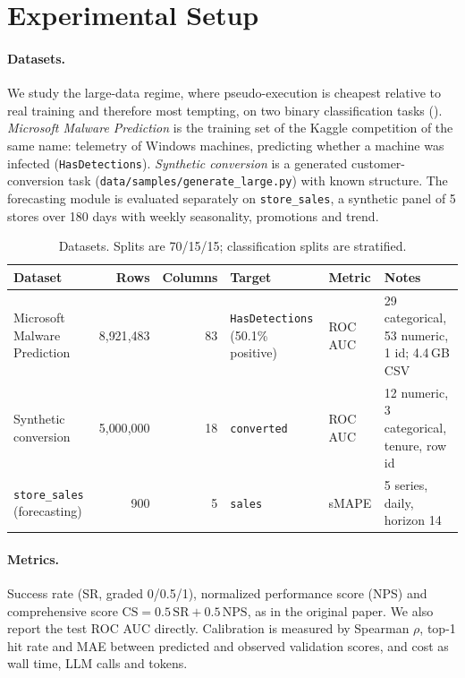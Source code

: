 \section{Experimental Setup}
\label{sec:setup}

\paragraph{Datasets.} We study the large-data regime, where pseudo-execution is cheapest relative to real training and therefore most tempting, on two binary classification tasks (). \emph{Microsoft Malware Prediction} is the training set of the Kaggle competition of the same name: telemetry of Windows machines, predicting whether a machine was infected (\texttt{HasDetections}). \emph{Synthetic conversion} is a generated customer-conversion task (\texttt{data/samples/generate\_large.py}) with known structure. The forecasting module is evaluated separately on \texttt{store\_sales}, a synthetic panel of 5 stores over 180 days with weekly seasonality, promotions and trend.

\begin{table}[t]
  \centering
  \caption{Datasets. Splits are 70/15/15; classification splits are stratified.}
  \label{tab:datasets}
  \small
  \begin{tabular}{lrrlll}
    \toprule
    Dataset & Rows & Columns & Target & Metric & Notes \\
    \midrule
    Microsoft Malware Prediction & 8{,}921{,}483 & 83 & \texttt{HasDetections} (50.1\% positive) & ROC AUC & 29 categorical, 53 numeric, 1 id; 4.4\,GB CSV \\
    Synthetic conversion & 5{,}000{,}000 & 18 & \texttt{converted} & ROC AUC & 12 numeric, 3 categorical, tenure, row id \\
    \texttt{store\_sales} (forecasting) & 900 & 5 & \texttt{sales} & sMAPE & 5 series, daily, horizon 14 \\
    \bottomrule
  \end{tabular}
\end{table}

\paragraph{Metrics.} Success rate (SR, graded 0/0.5/1), normalized performance score (NPS) and comprehensive score $\text{CS} = 0.5\,\text{SR} + 0.5\,\text{NPS}$, as in the original paper. We also report the test ROC AUC directly. Calibration is measured by Spearman $\rho$, top-1 hit rate and MAE between predicted and observed validation scores, and cost as wall time, LLM calls and tokens.

